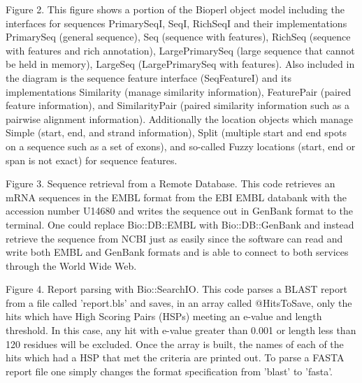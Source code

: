 \documentclass[12pt]{article}
\begin{document}
\newpage


Figure 2. This figure shows a portion of the Bioperl object model
including the interfaces for sequences PrimarySeqI, SeqI, RichSeqI and
their implementations PrimarySeq (general sequence), Seq (sequence
with features), RichSeq (sequence with features and rich
annotation), LargePrimarySeq (large sequence that cannot be held in memory),
LargeSeq (LargePrimarySeq with features).  Also included in the
diagram is the sequence feature interface (SeqFeatureI) and its
implementations Similarity (manage similarity information),
FeaturePair (paired feature information), and SimilarityPair (paired
similarity information such as a pairwise alignment information).
Additionally the location objects which manage Simple (start, end, and
strand information), Split (multiple start and end spots on a sequence
such as a set of exons), and so-called Fuzzy locations (start, end or span
is not exact) for sequence features.

\newpage


Figure 3. Sequence retrieval from a Remote Database.  This code
retrieves an mRNA sequences in the EMBL format from the EBI EMBL
databank with the accession number U14680 and writes the sequence out
in GenBank format to the terminal.  One could replace Bio::DB::EMBL
with Bio::DB::GenBank and instead retrieve the sequence from NCBI just
as easily since the software can read and write both EMBL and GenBank
formats and is able to connect to both services through the World Wide
Web.

\newpage


Figure 4. Report parsing with Bio::SearchIO.  This code parses a BLAST
report from a file called 'report.bls' and saves, in an array called
@HitsToSave, only the hits which have High Scoring Pairs (HSPs)
meeting an e-value and length threshold.  In this case, any hit with
e-value greater than 0.001 or length less than 120 residues will be
excluded.  Once the array is built, the names of each of the hits
which had a HSP that met the criteria are printed out.  To parse a
FASTA \cite{fasta} report file one simply changes the format
specification from 'blast' to 'fasta'.

\newpage

\singlespacing

%
%
\end{document}
